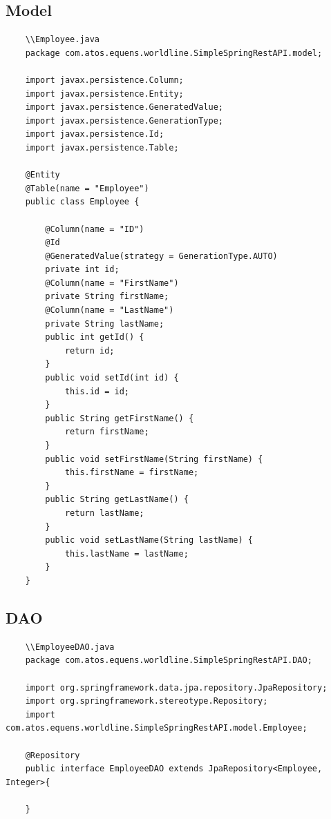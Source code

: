 \documentclass{report}
\begin{document}
	\subsection{Model}
	\begin{lstlisting}
	\\Employee.java
	package com.atos.equens.worldline.SimpleSpringRestAPI.model;
	
	import javax.persistence.Column;
	import javax.persistence.Entity;
	import javax.persistence.GeneratedValue;
	import javax.persistence.GenerationType;
	import javax.persistence.Id;
	import javax.persistence.Table;
	
	@Entity
	@Table(name = "Employee")
	public class Employee {
	
		@Column(name = "ID")
		@Id
		@GeneratedValue(strategy = GenerationType.AUTO)
		private int id;
		@Column(name = "FirstName")
		private String firstName;
		@Column(name = "LastName")
		private String lastName;
		public int getId() {
			return id;
		}
		public void setId(int id) {
			this.id = id;
		}
		public String getFirstName() {
			return firstName;
		}
		public void setFirstName(String firstName) {
			this.firstName = firstName;
		}
		public String getLastName() {
			return lastName;
		}
		public void setLastName(String lastName) {
			this.lastName = lastName;
		}		
	}
	\end{lstlisting}
	\subsection{DAO}
	\begin{lstlisting}
	\\EmployeeDAO.java
	package com.atos.equens.worldline.SimpleSpringRestAPI.DAO;
		
	import org.springframework.data.jpa.repository.JpaRepository;
	import org.springframework.stereotype.Repository;
	import com.atos.equens.worldline.SimpleSpringRestAPI.model.Employee;
		
	@Repository
	public interface EmployeeDAO extends JpaRepository<Employee, Integer>{

	}		
	\end{lstlisting}
\end{document}
